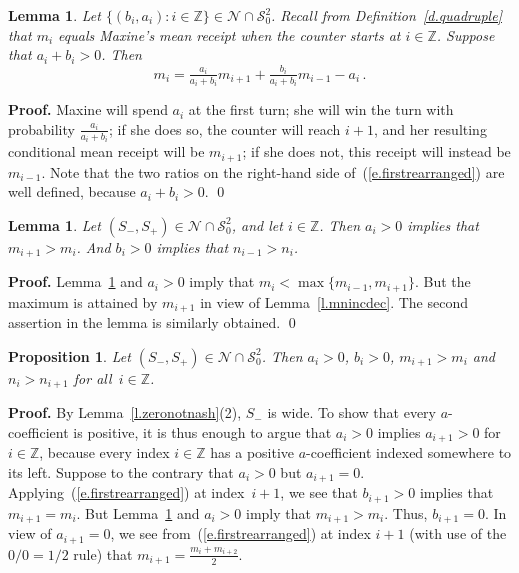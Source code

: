 \documentclass[letterpaper,11pt,oneside,reqno]{amsbook}
\newcommand{\Z}{\ensuremath{\mathbb{Z}}}
\numberwithin{figure}{chapter}
\newtheorem{lemma}[theorem]{Lemma}
\newtheorem{proposition}[theorem]{Proposition}
\theoremstyle{definition}
\theoremstyle{definition}
\theoremstyle{definition}
\theoremstyle{definition}
\theoremstyle{definition}
\newcommand{\mc}{\mathcal}
\newcommand{\tis}{\mc{S}_0}
\begin{document}
 
   
\begin{lemma}\label{l.firstrearranged}
Let  $\big\{ (b_i,a_i): i \in \Z \big\} \in \mc{N} \cap \tis^2$.  
Recall from Definition~\ref{d.quadruple} that $m_i$ equals Maxine's mean receipt when the counter starts at $i \in \Z$.
Suppose that $a_i + b_i > 0$. Then
\begin{equation}\label{e.firstrearranged}
m_i   =  \tfrac{a_i}{a_i + b_i} m_{i+1} + \tfrac{b_i}{a_i + b_i} m_{i-1} - a_i \, .
\end{equation}
\end{lemma}
{\bf Proof.}
 Maxine will spend $a_i$ at the first turn; she will win the turn with probability $\tfrac{a_i}{a_i + b_i}$; if she does so, the counter will reach $i+1$, and her resulting conditional mean receipt will be $m_{i+1}$; if she does not, this receipt will instead be $m_{i-1}$. Note that the two ratios on the right-hand side of~(\ref{e.firstrearranged}) are well defined, because  $a_i + b_i > 0$. \qed



\begin{lemma}\label{l.condpositive}
Let $(S_-,S_+) \in \mc{N} \cap \tis^2$, and let $i \in \Z$. Then $a_i > 0$ implies that $m_{i+1} > m_i$. And $b_i > 0$ implies that $n_{i-1} > n_i$.
\end{lemma}
{\bf Proof.} Lemma~\ref{l.firstrearranged} and $a_i > 0$ imply that $m_i < \max \{ m_{i-1},m_{i+1} \}$. But the maximum is attained by $m_{i+1}$ in view of Lemma~\ref{l.mnincdec}. 
The second assertion in the lemma is similarly obtained.
\qed


\begin{proposition}\label{p.allpositive}
Let $(S_-,S_+) \in \mc{N} \cap \tis^2$. Then $a_i > 0$, $b_i > 0$, $m_{i+1} > m_i$ and $n_i > n_{i+1}$ for all~$i \in \Z$.
\end{proposition}
{\bf Proof.} By Lemma~\ref{l.zeronotnash}(2), 
$S_-$ is wide. 
To show that every $a$-coefficient is positive, it is thus enough to 
argue that $a_i > 0$ implies $a_{i+1} > 0$ for $i \in \Z$,
because every index $i \in \Z$ has a positive $a$-coefficient indexed somewhere to its left.
Suppose to the contrary that $a_i > 0$ but $a_{i+1} = 0$. Applying~(\ref{e.firstrearranged}) at index~$i+1$, we see that $b_{i+1} > 0$ implies that  $m_{i+1} = m_i$. But Lemma~\ref{l.condpositive} and $a_i > 0$ imply that $m_{i+1} > m_i$. Thus, $b_{i+1} = 0$. In view of $a_{i+1} = 0$, we see from~(\ref{e.firstrearranged}) at index $i+1$ (with use of the $0/0 = 1/2$ rule) that $m_{i+1} = \tfrac{m_i + m_{i+2}}{2}$. 
\end{document}
